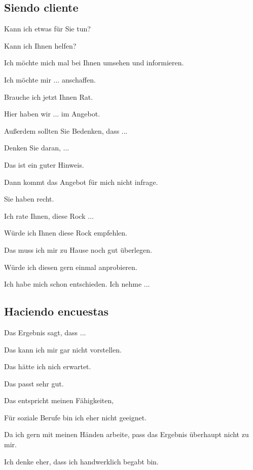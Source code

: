 \subsection{Siendo cliente}
\begin{myitemize}
\item Kann ich etwas für Sie tun?
\item Kann ich Ihnen helfen?
\item Ich möchte mich mal bei Ihnen umsehen und informieren.
\item Ich möchte mir ... anschaffen.
\item Brauche ich jetzt Ihnen Rat.
\item Hier haben wir ... im Angebot.
\item Außerdem sollten Sie Bedenken, dass ...
\item Denken Sie daran, ...
\item Das ist ein guter Hinweis. 
\item Dann kommt das Angebot für mich nicht infrage.
\item Sie haben recht.
\item Ich rate Ihnen, diese Rock ...
\item Würde ich Ihnen diese Rock empfehlen.
\item Das muss ich mir zu Hause noch gut überlegen.
\item Würde ich diesen gern einmal anprobieren.
\item Ich habe mich schon entschieden. Ich nehme ...
\end{myitemize}

\subsection{Haciendo encuestas}
\begin{myitemize}
\item Das Ergebnis sagt, dass ...
\item Das kann ich mir gar nicht vorstellen.
\item Das hätte ich nich erwartet.
\item Das passt sehr gut.
\item Das entspricht meinen Fähigkeiten,
\item Für soziale Berufe bin ich eher nicht geeignet.
\item Da ich gern mit meinen Händen arbeite, pass das Ergebnis überhaupt nicht zu mir.
\item Ich denke eher, dass ich handwerklich begabt bin.
\end{myitemize}

